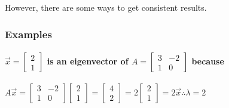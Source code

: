 \documentclass[
  letterpaper,
  DIV=11,
  numbers=noendperiod]{scrartcl}
\let\oldparagraph\paragraph
\renewcommand{\paragraph}[1]{\oldparagraph{#1}\mbox{}}
\begin{document}
However, there are some ways to get consistent results.

\hypertarget{examples-2}{%
\subsubsection{Examples}\label{examples-2}}

\hypertarget{vecx-beginbmatrix2-1-endbmatrix-is-an-eigenvector-of-a-beginbmatrix3--2-1-0endbmatrix-because}{%
\paragraph{\texorpdfstring{\(\vec{x} = \begin{bmatrix}2 \\ 1 \end{bmatrix}\)
is an eigenvector of \(A = \begin{bmatrix}3 & -2 \\ 1 & 0\end{bmatrix}\)
because}{\textbackslash vec\{x\} = \textbackslash begin\{bmatrix\}2 \textbackslash\textbackslash{} 1 \textbackslash end\{bmatrix\} is an eigenvector of A = \textbackslash begin\{bmatrix\}3 \& -2 \textbackslash\textbackslash{} 1 \& 0\textbackslash end\{bmatrix\} because}}\label{vecx-beginbmatrix2-1-endbmatrix-is-an-eigenvector-of-a-beginbmatrix3--2-1-0endbmatrix-because}}

\(A\vec{x} = \begin{bmatrix}3 & -2 \\ 1 & 0\end{bmatrix}\begin{bmatrix}2 \\ 1\end{bmatrix} = \begin{bmatrix}4 \\ 2\end{bmatrix} = 2\begin{bmatrix}2 \\ 1\end{bmatrix} = 2\vec{x} \therefore \lambda = 2\)
\end{document}
